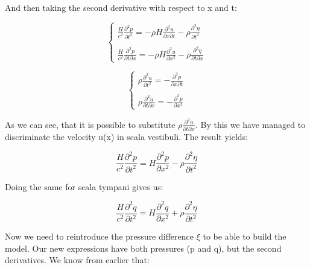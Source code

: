\documentclass[twoside,twocolumn]{article}
\begin{document}
And then taking the second derivative with respect to x and t: 

 \begin{equation}
    \left\{
                \begin{array}{ll}
                  \frac{H}{c^2}\frac{\partial^2 p}{\partial t^2} = -\rho H \frac{\partial^2 u}{\partial x\partial t}  - \rho \frac{\partial^2 \eta}{\partial t^2}\\
                  \\
                 \frac{H}{c^2}\frac{\partial^2 p}{\partial t \partial x} = -\rho H \frac{\partial^2 u}{\partial x^2}  - \rho \frac{\partial^2 \eta}{\partial t\partial x}
                \end{array}
              \right.
\end{equation}

\bigskip

 \begin{equation}
    \left\{
                \begin{array}{ll}
                  \rho\frac{\partial^2 u}{\partial t^2} = -\frac{\partial^2 p}{\partial x\partial t}\\
                  \\
                  \rho\frac{\partial^2 u}{\partial t\partial x} = -\frac{\partial^2 p}{\partial x^2}
                \end{array}
              \right.
\end{equation}

\bigskip

As we can see, that it is possible to substitute $ \rho\frac{\partial^2 u}{\partial t\partial x}$. By this we have managed to discriminate the velocity u(x) in scala vestibuli. The result yields: 

 \begin{equation}
 \frac{H}{c^2}\frac{\partial^2 p}{\partial t^2} = H \frac{\partial^2 p}{\partial x^2}  - \rho \frac{\partial^2 \eta}{\partial t^2}
\end{equation}

Doing the same for scala tympani gives us: 

 \begin{equation}
 \frac{H}{c^2}\frac{\partial^2 q}{\partial t^2} = H \frac{\partial^2 q}{\partial x^2}  + \rho \frac{\partial^2 \eta}{\partial t^2}
\end{equation}

Now we need to reintroduce the pressure difference $\xi$ to be able to build the model. Our new expressions have both pressures (p and q), but the second derivatives.  We know from earlier that: 
\end{document}
